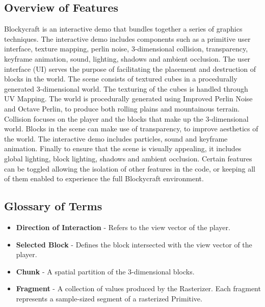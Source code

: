 \documentclass[a4paper,11pt,titlepage]{scrartcl}
\newcommand{\Blockycraft}{Blockycraft}
\begin{document}
\subsection{Overview of Features}
\Blockycraft{} is an interactive demo that bundles together a series of graphics techniques.  The interactive demo includes components such as a primitive user interface, texture mapping, perlin noise, 3-dimensional collision, transparency, keyframe animation, sound, lighting, shadows and ambient occlusion.  The user interface (UI) serves the purpose of facilitating the placement and destruction of blocks in the world.  The scene consists of textured cubes in a procedurally generated 3-dimensional world.  The texturing of the cubes is handled through UV Mapping.  The world is procedurally generated using Improved Perlin Noise and Octave Perlin, to produce both rolling plains and mountainous terrain.  Collision focuses on the player and the blocks that make up the 3-dimensional world.  Blocks in the scene can make use of transparency, to improve aesthetics of the world.  The interactive demo includes particles, sound and keyframe animation.  Finally to ensure that the scene is visually appealing, it includes global lighting, block lighting, shadows and ambient occlusion.  Certain features can be toggled allowing the isolation of other features in the code, or keeping all of them enabled to experience the full \Blockycraft{} environment.

\subsection{Glossary of Terms}
\begin{itemize}
\item \textbf{Direction of Interaction} - Refers to the view vector of the player.
\item \textbf{Selected Block} - Defines the block intersected with the view vector of the player.
\item \textbf{Chunk} - A spatial partition of the 3-dimensional blocks.
\item \textbf{Fragment} - A collection of values produced by the Rasterizer. Each fragment represents a sample-sized segment of a rasterized Primitive.
\end{itemize}

\end{document}
